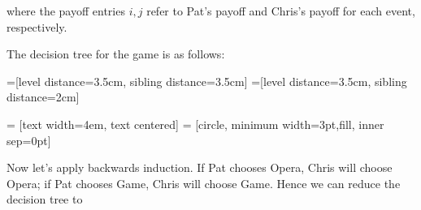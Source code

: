 \documentclass{article}
\begin{document}
where the payoff entries $i, j$ refer to Pat's payoff and Chris's payoff
for each event, respectively.

The decision tree for the game is as follows:

=[level distance=3.5cm, sibling distance=3.5cm]
=[level distance=3.5cm, sibling distance=2cm]

 = [text width=4em, text centered]
 = [circle, minimum width=3pt,fill, inner sep=0pt]

\begin{center}
\end{center}

Now let's apply backwards induction. If Pat chooses Opera, Chris will
choose Opera; if Pat chooses Game, Chris will choose Game. Hence we can
reduce the decision tree to
\end{document}
